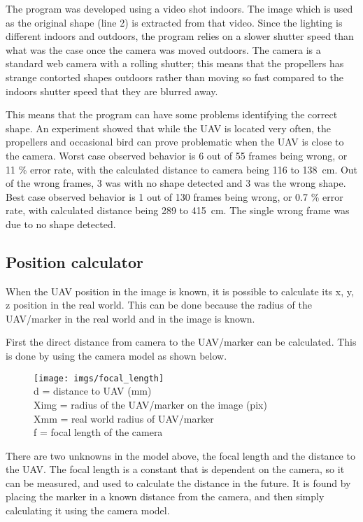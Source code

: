 The program was developed using a video shot indoors. The image which is used as the original shape (line 2) is extracted from that video. Since the lighting is different indoors and outdoors, the program relies on a slower shutter speed than what was the case once the camera was moved outdoors. The camera is a standard web camera with a rolling shutter; this means that the propellers has strange contorted shapes outdoors rather than moving so fast compared to the indoors shutter speed that they are blurred away. 

This means that the program can have some problems identifying the correct shape. An experiment showed that while the UAV is located very often, the propellers and occasional bird can prove problematic when the UAV is close to the camera. Worst case observed behavior is 6 out of 55 frames being wrong, or 11 \% error rate, with the calculated distance to camera being 116 to \SI{138}{\centi\meter}. Out of the wrong frames, 3 was with no shape detected and 3 was the wrong shape. Best case observed behavior is 1 out of 130 frames being wrong, or 0.7 \% error rate, with calculated distance being 289 to \SI{415}{\centi\meter}. The single wrong frame was due to no shape detected.
\subsection{Position calculator}
When the UAV position in the image is known, it is possible to calculate its x, y, z position in the real world. This can be done because the radius of the UAV/marker in the real world and in the image is known. 

First the direct distance from camera to the UAV/marker can be calculated. This is done by using the camera model as shown below.
\begin{figure}[h!]
	\centering
	\texttt{[image: imgs/focal\_length]}\\
	d = distance to UAV (\si{\milli\meter})\\
	Ximg = radius of the UAV/marker on the image (pix)\\
	Xmm = real world radius of UAV/marker\\
	f = focal length of the camera
\end{figure}

There are two unknowns in the model above, the focal length and the distance to the UAV. The focal length is a constant that is dependent on the camera, so it can be measured, and used to calculate the distance in the future. 
It is found by placing the marker in a known distance from the camera, and then simply calculating it using the camera model.

